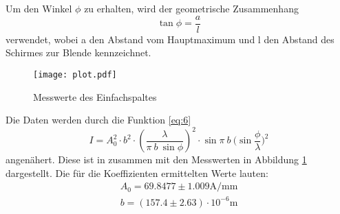   Um den Winkel $\phi$ zu erhalten, wird der geometrische Zusammenhang
  \begin{equation*}
    \tan{\phi}=\dfrac{a}{l}
  \end{equation*}
  verwendet, wobei a den Abstand vom Hauptmaximum und l den Abstand des Schirmes zur Blende
  kennzeichnet.
  \begin{figure}[H]
    \centering
    \texttt{[image: plot.pdf]}
    \caption{Messwerte des Einfachspaltes}
    \label{fig:einzel}
  \end{figure}
  Die Daten werden durch die Funktion \ref{eq:6}
  \begin{equation*}
    I=A_0^2\cdot b^2\cdot (\dfrac{\lambda}{\pi \ b \ \sin{\phi}})^2 \cdot \sin{\pi \ b \ (\sin{\dfrac{\phi}{\lambda}}})^2
  \end{equation*}
  angenähert. Diese ist in zusammen mit den Messwerten in Abbildung \ref{fig:einzel} dargestellt.
  Die für die Koeffizienten ermittelten Werte lauten:
  \begin{align*}
    A_0 = 69.8477 \pm 1.009 \si{\ampere \per \milli \metre}\\
    b = (157.4 \pm 2.63) \cdot 10^{-6} \si{\metre}
  \end{align*}
  

